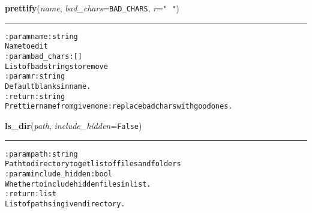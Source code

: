     \vspace{0.5ex}

\hspace{.8\funcindent}\begin{boxedminipage}{\funcwidth}

    \raggedright \textbf{prettify}(\textit{name}, \textit{bad\_chars}={\tt BAD\_CHARS}, \textit{r}={\tt " "})

    \vspace{-1.5ex}

    \rule{\textwidth}{0.5\fboxrule}
\setlength{\parskip}{2ex}
\begin{alltt}

:param name: string
    Name to edit
:param bad\_chars: []
    List of bad strings to remove
:param r: string
    Default blanks in name.
:return: string
    Prettier name from given one: replace bad chars with good ones.
\end{alltt}

\setlength{\parskip}{1ex}
    \end{boxedminipage}

    \label{hal:files:models:FileSystem:ls_dir}

    \vspace{0.5ex}

\hspace{.8\funcindent}\begin{boxedminipage}{\funcwidth}

    \raggedright \textbf{ls\_dir}(\textit{path}, \textit{include\_hidden}={\tt False})

    \vspace{-1.5ex}

    \rule{\textwidth}{0.5\fboxrule}
\setlength{\parskip}{2ex}
\begin{alltt}

:param path: string
    Path to directory to get list of files and folders
:param include\_hidden: bool
    Whether to include hidden files in list.
:return: list
    List of paths in given directory.
\end{alltt}

\setlength{\parskip}{1ex}
    \end{boxedminipage}

    \label{hal:files:models:FileSystem:ls_recurse}

